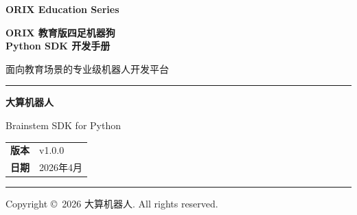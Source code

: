 \documentclass[a4paper,11pt,openany]{book}
\begin{document}
\begin{titlepage}
\begin{center}

\noindent\colorbox{brandteal}{%
  \parbox{\dimexpr\textwidth-2\fboxsep}{%
    \vspace{0.6cm}
    \centering\color{white}\Large\bfseries ORIX Education Series
    \vspace{0.6cm}
  }%
}

\vspace{2.5cm}

{\Huge\bfseries\color{brandteal} ORIX 教育版四足机器狗\\[0.5em] Python SDK 开发手册}

\vspace{0.8cm}

{\large\color{brandslate} 面向教育场景的专业级机器人开发平台}

\vspace{1.5cm}

{\color{brandteal}\rule{0.6\textwidth}{1.2pt}}

\vspace{1.5cm}

{\LARGE\bfseries 大算机器人}

\vspace{0.8cm}

{\Large\color{brandslate} Brainstem SDK for Python}

\vspace{2cm}

\begin{tabular}{rl}
\textbf{版本} & v1.0.0 \\
\textbf{日期} & 2026年4月 \\
\end{tabular}

\vfill

{\color{brandteal}\rule{\textwidth}{0.8pt}}
\vspace{0.3cm}

{\small\color{brandslate} Copyright \copyright\ 2026 大算机器人. All rights reserved.}

\end{center}
\end{titlepage}
\end{document}
